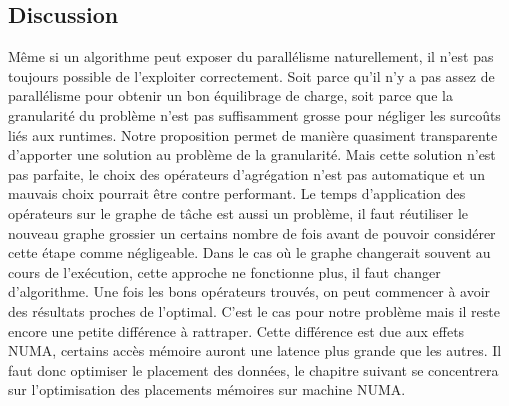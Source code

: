 \subsection{Discussion}
Même si un algorithme peut exposer du parallélisme naturellement, il n'est pas toujours possible de l'exploiter correctement.
%
Soit parce qu'il n'y a pas assez de parallélisme pour obtenir un bon équilibrage de charge, soit parce que la granularité du problème n'est pas suffisamment grosse pour négliger les surcoûts liés aux runtimes.
%
Notre proposition permet de manière quasiment transparente d'apporter une solution au problème de la granularité.
%
Mais cette solution n'est pas parfaite, le choix des opérateurs d'agrégation n'est pas automatique et un mauvais choix pourrait être contre performant.
%
Le temps d'application des opérateurs sur le graphe de tâche est aussi un problème, il faut réutiliser le nouveau graphe grossier un certains nombre de fois avant de pouvoir considérer cette étape comme négligeable.
%
Dans le cas où le graphe changerait souvent au cours de l'exécution, cette approche ne fonctionne plus, il faut changer d'algorithme.
%
Une fois les bons opérateurs trouvés, on peut commencer à avoir des résultats proches de l'optimal.
%
C'est le cas pour notre problème mais il reste encore une petite différence à rattraper.
%
Cette différence est due aux effets NUMA, certains accès mémoire auront une latence plus grande que les autres.
%
Il faut donc optimiser le placement des données, le chapitre suivant se concentrera sur l'optimisation des placements mémoires sur machine NUMA.
